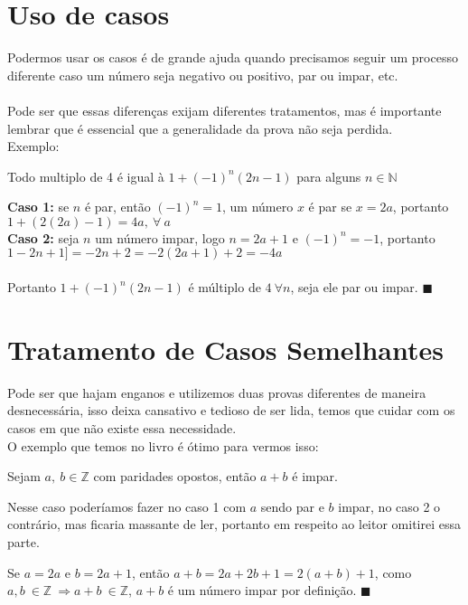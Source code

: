 \documentclass[main.tex]{subfiles}
\begin{document}
\section{Uso de casos}
Podermos usar os casos é de grande ajuda quando precisamos seguir um processo diferente caso um número seja negativo ou positivo, par ou impar, etc.
\\
\\
Pode ser que essas diferenças exijam diferentes tratamentos, mas é importante lembrar que é essencial que a generalidade da prova não seja perdida.
\\
Exemplo:
\begin{proposition}
Todo multiplo de 4 é igual à $1+(-1)^n(2n-1)$ para alguns $n \in \mathbb{N}$
\end{proposition}
\begin{demonstration}
\textbf{Caso 1:} se $n$ é par, então $(-1)^n =1$, um número $x$ é par se $x=2a$, portanto $1+(2(2a)-1) = 4a, \ \forall \ a$ \\
\textbf{Caso 2:} seja $n$ um número impar, logo $n=2a+1$ e $(-1)^n = -1$, portanto $1-2n+1] = -2n + 2= -2(2a+1) + 2 = -4a$
\\
\\
Portanto $1+(-1)^n(2n-1)$ é múltiplo de $4 \ \forall n$, seja ele par ou impar. $\blacksquare$ 
\end{demonstration}
\section{Tratamento de Casos Semelhantes}
Pode ser que hajam enganos e utilizemos duas provas diferentes de maneira desnecessária, isso deixa cansativo e tedioso de ser lida, temos que cuidar com os casos em que não existe essa necessidade.
\\
O exemplo que temos no livro é ótimo para vermos isso:

\begin{proposition}
Sejam $a, \ b  \in \mathbb{Z}$ com paridades opostos, então $a+b$ é impar.
\end{proposition}

Nesse caso poderíamos fazer no caso 1 com $a$ sendo par e $b$ impar, no caso 2 o contrário, mas ficaria massante de ler, portanto em respeito ao leitor omitirei essa parte.

\begin{demonstration}
Se $a = 2a$ e $b=2a+1$, então $a+b = 2a+2b+1 = 2(a+b) +1$, como $a,b \ \in \mathbb{Z} \ \Rightarrow a+b \ \in \mathbb{Z}$, $a+b$ é um número impar por definição. $\blacksquare$ 
\end{demonstration}
\end{document}
